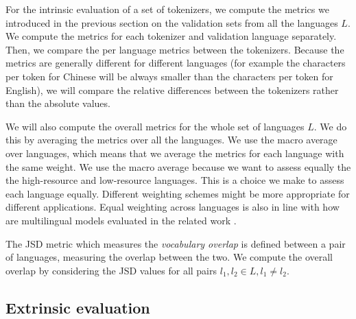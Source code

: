 For the intrinsic evaluation of a set of tokenizers, we compute the metrics we introduced in the previous section on the validation sets from all the languages $L$. We compute the metrics for each tokenizer and validation language separately. Then, we compare the per language metrics between the tokenizers. Because the metrics are generally different for different languages (for example the characters per token for Chinese will be always smaller than the characters per token for English), we will compare the relative differences between the tokenizers rather than the absolute values.

We will also compute the overall metrics for the whole set of languages $L$. We do this by averaging the metrics over all the languages. We use the macro average over languages, which means that we average the metrics for each language with the same weight. We use the macro average because we want to assess equally the  the high-resource and low-resource languages. This is a choice we make to assess each language equally. Different weighting schemes might be more appropriate for different applications. Equal weighting across languages is also in line with how are multilingual models evaluated in the related work \cite{ruder_xtreme-r_2021}.

The JSD metric which measures the \textit{vocabulary overlap} is defined between a pair of languages, measuring the overlap between the two. We compute the overall overlap by considering the JSD values for all pairs  $l_1, l_2 \in L, l_1 \neq l_2$.

\subsection{Extrinsic evaluation}
\label{sec:extrinsic_evaluation}

